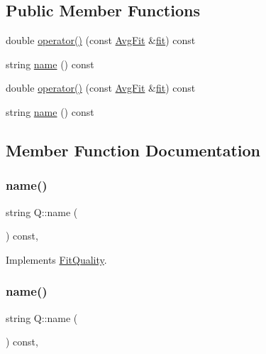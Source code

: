 \subsection*{Public Member Functions}
\begin{DoxyCompactItemize}
\item 
double \mbox{\hyperlink{classQ_a783778170d5dbec7517dbe5c6f00a3c3}{operator()}} (const \mbox{\hyperlink{classAvgFit}{Avg\+Fit}} \&\mbox{\hyperlink{src_2lib_2three__point__timeslice__fitting_8h_aa079c61e69a3946e3351db64a3478612}{fit}}) const
\item 
string \mbox{\hyperlink{classQ_a31d9d5bc680b063c2f80238795c7a6c0}{name}} () const
\item 
double \mbox{\hyperlink{classQ_a783778170d5dbec7517dbe5c6f00a3c3}{operator()}} (const \mbox{\hyperlink{classAvgFit}{Avg\+Fit}} \&\mbox{\hyperlink{src_2lib_2three__point__timeslice__fitting_8h_aa079c61e69a3946e3351db64a3478612}{fit}}) const
\item 
string \mbox{\hyperlink{classQ_a31d9d5bc680b063c2f80238795c7a6c0}{name}} () const
\end{DoxyCompactItemize}


\subsection{Member Function Documentation}
\mbox{\label{classQ_a31d9d5bc680b063c2f80238795c7a6c0}} 
\subsubsection{\texorpdfstring{name()}{name()}\hspace{0.1cm}{\footnotesize\ttfamily [1/2]}}
{\footnotesize\ttfamily string Q\+::name (\begin{DoxyParamCaption}{ }\end{DoxyParamCaption}) const\hspace{0.3cm}{\ttfamily [inline]}, {\ttfamily [virtual]}}



Implements \mbox{\hyperlink{classFitQuality_a3423e236f25d68cf822094b363a74780}{Fit\+Quality}}.

\mbox{\label{classQ_a31d9d5bc680b063c2f80238795c7a6c0}} 
\subsubsection{\texorpdfstring{name()}{name()}\hspace{0.1cm}{\footnotesize\ttfamily [2/2]}}
{\footnotesize\ttfamily string Q\+::name (\begin{DoxyParamCaption}{ }\end{DoxyParamCaption}) const\hspace{0.3cm}{\ttfamily [inline]}, {\ttfamily [virtual]}}



